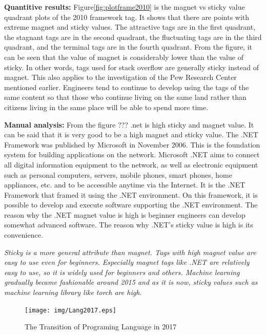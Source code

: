 \documentclass[conference]{IEEEtran}
\begin{document}
\textbf{Quantitive results:}
Figure\ref{fig:plotframe2010} is the magnet vs sticky value quadrant plots of the 2010 framework tag. It shows that there are points with extreme magnet and sticky values. The attractive tags are in the first quadrant, the stagnant tags are in the second quadrant, the fluctuating tags are in the third quadrant, and the terminal tags are in the fourth quadrant. From the figure, it can be seen that the value of magnet is considerably lower than the value of sticky. In other words, tags used for stack overflow are generally sticky instead of magnet. This also applies to the investigation of the Pew Research Center mentioned earlier. Engineers tend to continue to develop using the tags of the same content so that those who continue living on the same land rather than citizens living in the same place will be able to spend more time. 

\textbf{Manual analysis:}
From the figure ??? .net is high sticky and magnet value. It can be said that it is very good to be a high magnet and sticky value. The .NET Framework was published by Microsoft in November 2006. This is the foundation system for building applications on the network.  Microsoft .NET aims to connect all digital information equipment to the network, as well as electronic equipment such as personal computers, servers, mobile phones, smart phones, home appliances, etc. and to be accessible anytime via the Internet. It is the .NET Framework that framed it using the .NET environment. On this framework, it is possible to develop and execute software supporting the .NET environment. The reason why the .NET magnet value is high is beginner engineers can develop somewhat advanced software. The reason why .NET's sticky value is high is its convenience.
\medskip
 

 \emph{Sticky is a more general attribute than magnet. Tags with high magnet value are easy to use even for beginners. Especially magnet tags like .NET are relatively easy to use, so it is widely used for beginners and others. Machine learning gradually became fashionable around 2015 and as it is now, sticky values such as machine learning library like torch are high.}
\medskip


\begin{figure}[t]
 \centering
 \texttt{[image: img/Lang2017.eps]}  
 \caption{The Transition of Programing Language in 2017} 
 \label{fig:envtrans2018} 
\end{figure}
\end{document}
